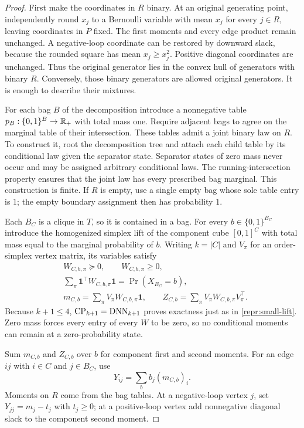 \begin{proof}
First make the coordinates in $R$ binary. At an original generating point,
independently round $x_j$ to a Bernoulli variable with mean $x_j$ for every
$j\in R$, leaving coordinates in $P$ fixed. The first moments and every
edge product remain unchanged. A negative-loop coordinate can be restored
by downward slack, because the rounded square has mean $x_j\geq x_j^2$.
Positive diagonal coordinates are unchanged. Thus the original generator
lies in the convex hull of generators with binary $R$. Conversely, those
binary generators are allowed original generators. It is enough to
describe their mixtures.

For each bag $B$ of the decomposition introduce a nonnegative table
$p_B:\{0,1\}^B\to\mathbb R_+$ with total mass one. Require adjacent bags to
agree on the marginal table of their intersection. These tables admit a
joint binary law on $R$. To construct it, root the decomposition tree and
attach each child table by its conditional law given the separator state.
Separator states of zero mass never occur and may be assigned arbitrary
conditional laws. The running-intersection property ensures that the
joint law has every prescribed bag marginal. This construction is finite.
If $R$ is empty, use a single empty bag whose sole table entry is $1$;
the empty boundary assignment then has probability $1$.

Each $B_C$ is a clique in $T$, so it is contained in a bag. For every
$b\in\{0,1\}^{B_C}$ introduce the homogenized simplex lift of the component
cube $[0,1]^C$ with total mass equal to the marginal probability of $b$.
Writing $k=|C|$ and $V_\pi$ for an order-simplex vertex matrix, its variables
satisfy
\begin{align*}
 &W_{C,b,\pi}\succeq0,\qquad W_{C,b,\pi}\geq0,\\
 &\sum_\pi\mathbf1^\top W_{C,b,\pi}\mathbf1
      =\Pr(X_{B_C}=b),\\
 &m_{C,b}=\sum_\pi V_\pi W_{C,b,\pi}\mathbf1,
 \qquad Z_{C,b}=\sum_\pi V_\pi W_{C,b,\pi}V_\pi^\top.
\end{align*}
Because $k+1\leq4$, $\operatorname{CP}_{k+1}=\operatorname{DNN}_{k+1}$ proves exactness just as in
\eqref{repr:small-lift}. Zero mass forces every entry of every $W$ to be
zero, so no conditional moments can remain at a zero-probability state.

Sum $m_{C,b}$ and $Z_{C,b}$ over $b$ for component first and second moments.
For an edge $ij$ with $i\in C$ and $j\in B_C$, use
\[
 Y_{ij}=\sum_b b_j(m_{C,b})_i.
\]
Moments on $R$ come from the bag tables. At a negative-loop vertex $j$,
set $Y_{jj}=m_j-t_j$ with $t_j\geq0$; at a positive-loop vertex add
nonnegative diagonal slack to the component second moment.


\end{proof}
